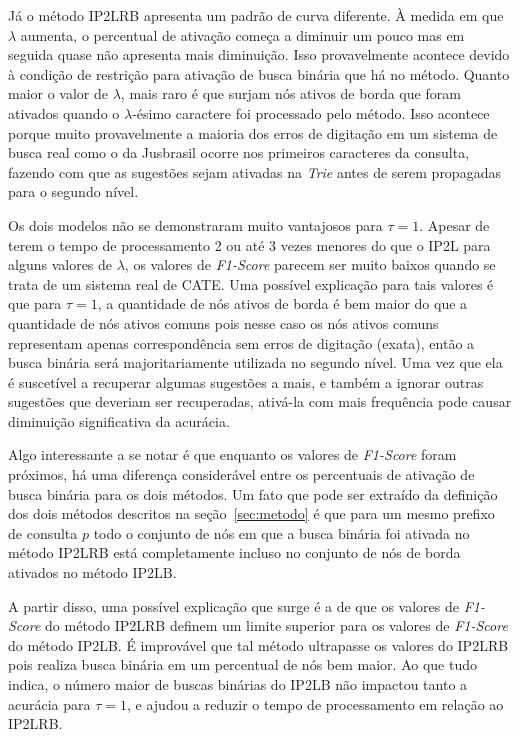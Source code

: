 Já o método IP2LRB apresenta um padrão de curva diferente. À medida em que $\lambda$ aumenta, o percentual de ativação começa a diminuir um pouco mas em seguida quase não apresenta mais diminuição. Isso provavelmente acontece devido à condição de restrição para ativação de busca binária que há no método. Quanto maior o valor de $\lambda$, mais raro é que surjam nós ativos de borda que foram ativados quando o $\lambda$-ésimo caractere foi processado pelo método. Isso acontece porque muito provavelmente a maioria dos erros de digitação em um sistema de busca real como o da Jusbrasil ocorre nos primeiros caracteres da consulta, fazendo com que as sugestões sejam ativadas na \textit{Trie} antes de serem propagadas para o segundo nível. 

Os dois modelos não se demonstraram muito vantajosos para $\tau=1$. Apesar de terem o tempo de processamento 2 ou até 3 vezes menores do que o IP2L para alguns valores de $\lambda$, os valores de \textit{F1-Score} parecem ser muito baixos quando se trata de um sistema real de CATE. Uma possível explicação para tais valores é que para $\tau=1$, a quantidade de nós ativos de borda é bem maior do que a quantidade de nós ativos comuns pois nesse caso os nós ativos comuns representam apenas correspondência sem erros de digitação (exata), então a busca binária será majoritariamente utilizada no segundo nível. Uma vez que ela é suscetível a recuperar algumas sugestões a mais, e também a ignorar outras sugestões que deveriam ser recuperadas, ativá-la com mais frequência pode causar diminuição significativa da acurácia.

Algo interessante a se notar é que enquanto os valores de \textit{F1-Score} foram próximos, há uma diferença considerável entre os percentuais de ativação de busca binária para os dois métodos. Um fato que pode ser extraído da definição dos dois métodos descritos na seção~\ref{sec:metodo} é que para um mesmo prefixo de consulta $p$ todo o conjunto de nós em que a busca binária foi ativada no método IP2LRB está completamente incluso no conjunto de nós de borda ativados no método IP2LB. 

A partir disso, uma possível explicação que surge é a de que os valores de \textit{F1-Score} do método IP2LRB definem um limite superior para os valores de \textit{F1-Score} do método IP2LB. É improvável que tal método ultrapasse os valores do IP2LRB pois realiza busca binária em um percentual de nós bem maior. Ao que tudo indica, o número maior de buscas binárias do IP2LB não impactou tanto a acurácia para $\tau=1$, e ajudou a reduzir o tempo de processamento em relação ao IP2LRB.

